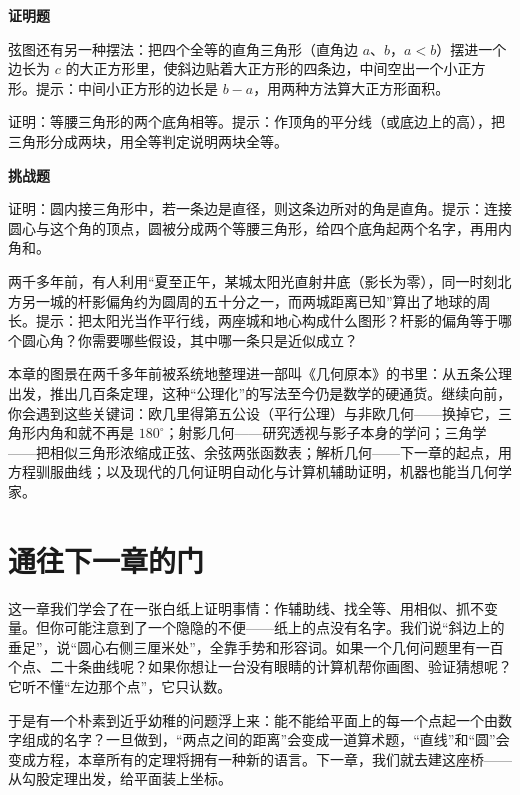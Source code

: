 \textbf{证明题}
\begin{sikao}
\item 弦图还有另一种摆法：把四个全等的直角三角形（直角边 $a$、$b$，$a<b$）摆进一个边长为 $c$ 的大正方形里，使斜边贴着大正方形的四条边，中间空出一个小正方形。提示：中间小正方形的边长是 $b-a$，用两种方法算大正方形面积。
\item 证明：等腰三角形的两个底角相等。提示：作顶角的平分线（或底边上的高），把三角形分成两块，用全等判定说明两块全等。
\end{sikao}

\textbf{挑战题}
\begin{sikao}
\item 证明：圆内接三角形中，若一条边是直径，则这条边所对的角是直角。提示：连接圆心与这个角的顶点，圆被分成两个等腰三角形，给四个底角起两个名字，再用内角和。
\item 两千多年前，有人利用“夏至正午，某城太阳光直射井底（影长为零），同一时刻北方另一城的杆影偏角约为圆周的五十分之一，而两城距离已知”算出了地球的周长。提示：把太阳光当作平行线，两座城和地心构成什么图形？杆影的偏角等于哪个圆心角？你需要哪些假设，其中哪一条只是近似成立？
\end{sikao}

\begin{pandeng}
本章的图景在两千多年前被系统地整理进一部叫《几何原本》的书里：从五条公理出发，推出几百条定理，这种“公理化”的写法至今仍是数学的硬通货。继续向前，你会遇到这些关键词：欧几里得第五公设（平行公理）与非欧几何——换掉它，三角形内角和就不再是 $180^\circ$；射影几何——研究透视与影子本身的学问；三角学——把相似三角形浓缩成正弦、余弦两张函数表；解析几何——下一章的起点，用方程驯服曲线；以及现代的几何证明自动化与计算机辅助证明，机器也能当几何学家。
\end{pandeng}

\section*{通往下一章的门}

这一章我们学会了在一张白纸上证明事情：作辅助线、找全等、用相似、抓不变量。但你可能注意到了一个隐隐的不便——纸上的点没有名字。我们说“斜边上的垂足”，说“圆心右侧三厘米处”，全靠手势和形容词。如果一个几何问题里有一百个点、二十条曲线呢？如果你想让一台没有眼睛的计算机帮你画图、验证猜想呢？它听不懂“左边那个点”，它只认数。

于是有一个朴素到近乎幼稚的问题浮上来：能不能给平面上的每一个点起一个由数字组成的名字？一旦做到，“两点之间的距离”会变成一道算术题，“直线”和“圆”会变成方程，本章所有的定理将拥有一种新的语言。下一章，我们就去建这座桥——从勾股定理出发，给平面装上坐标。
